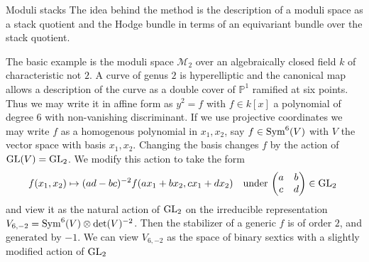 \documentclass[12pt]{amsart}
\numberwithin{equation}{section}
\newcommand{\PP}{\mathbb P}
\numberwithin{equation}{section}
\theoremstyle{definition}
\theoremstyle{remark}
\begin{document}
\begin{section}{Moduli stacks}
The idea behind the method is the description of a moduli space as a stack quotient
and the Hodge bundle in terms of an equivariant bundle over the stack quotient.

The basic example is the moduli space $\mathcal{M}_2$ over an algebraically closed
field $k$ of characteristic not $2$. A curve of genus $2$ is hyperelliptic and 
the canonical map allows a description of the curve as a double cover of ${\PP}^1$
ramified at six points. Thus we may write it in affine form as $y^2=f$ with $f\in k[x]$ a polynomial of
degree $6$ with non-vanishing discriminant. If we use projective coordinates we may write
$f$ as a homogenous polynomial in $x_1,x_2$, say $f \in {\rm Sym}^6(V)$ with $V$
the vector space with basis $x_1,x_2$. Changing the basis changes $f$ by the action of
${\rm GL}(V)={\rm GL}_2$. We modify this action to take the form 
$$
f(x_1,x_2) \mapsto (ad-bc)^{-2} f(ax_1+bx_2,cx_1+dx_2)\quad \text{\rm under 
$\left( \begin{matrix} a &b \\ c & d \\ \end{matrix} \right) \in {\rm GL}_2$ }
$$
and view it as the natural action of ${\rm GL}_2$ on the irreducible
representation $V_{6,-2}={\rm Sym}^6(V)\otimes \det(V)^{-2}$.
 Then the stabilizer of a generic $f$ is of order $2$, and generated by $-1$.
We can view $V_{6,-2}$ as the space of binary sextics with a slightly
modified action of ${\rm GL}_2$


\end{section}
\end{document}
